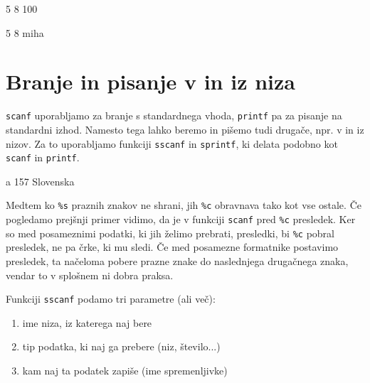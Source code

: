 \documentclass{book}
\begin{document}
\begin{examples}


\begin{inout}
	5 8 100
\end{inout}
\begin{inout}
	5 8 miha
\end{inout}


\end{examples}

\newpage
\section{Branje in pisanje v in iz niza}

\verb+scanf+ uporabljamo za branje s standardnega vhoda, \verb+printf+ pa za pisanje na standardni izhod.
Namesto tega lahko beremo in pišemo tudi drugače, npr. v in iz nizov.
Za to uporabljamo funkciji \verb+sscanf+ in \verb+sprintf+, ki delata podobno kot \verb+scanf+ in \verb+printf+.

\begin{examples}


\begin{inout}

\tcblower
a 157 Slovenska
\end{inout}

\end{examples}

\begin{errors}
Medtem ko \verb+%s+ praznih znakov ne shrani, jih \verb+%c+ obravnava tako kot
vse ostale. Če pogledamo prejšnji primer vidimo, da je v funkciji
\verb+scanf+ pred \verb+%c+ presledek. Ker so med posameznimi podatki, ki
jih želimo prebrati, presledki, bi \verb+%c+ pobral presledek, ne pa črke,
ki mu sledi. Če med posamezne formatnike postavimo presledek, ta načeloma
pobere prazne znake do naslednjega drugačnega znaka, vendar to v splošnem
ni dobra praksa.
\end{errors}

\noindent Funkciji \verb+sscanf+ podamo tri parametre (ali več):
\begin{enumerate}
	\item ime niza, iz katerega naj bere
	\item tip podatka, ki naj ga prebere (niz, število...)
	\item kam naj ta podatek zapiše (ime spremenljivke)
\end{enumerate}
\end{document}
